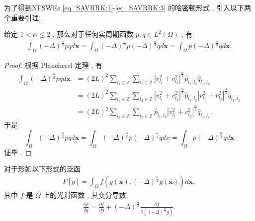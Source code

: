 为了得到NFSWEs \eqref{eq_SAVRRK:1}-\eqref{eq_SAVRRK:3} 的哈密顿形式 , 引入以下两个重要引理 . 
\begin{lemma}\label{lem_PAVF:1}
	\cite{fuStructurepreservingAlgorithmsTwodimensional2020} 
	 给定 $1<\alpha \leq 2$ , 那么对于任何实周期函数 $p , q \in L^{2}(\Omega)$ , 有
	\begin{align}\label{eq_PAVF:22}
	\int_{\Omega}(-\Delta)^{\frac{\alpha}{2}} p q d \boldsymbol{x}=\int_{\Omega}(-\Delta)^{\frac{\alpha}{4}} p(-\Delta)^{\frac{\alpha}{4}} q d \boldsymbol{x}=\int_{\Omega} p(-\Delta)^{\frac{\alpha}{2}} q d \boldsymbol{x} . 
	\end{align}
	\end{lemma}

\begin{proof}
	根据 Plancherel 定理 , 有
\begin{equation}
\begin{aligned}
\int_{\Omega}(-\Delta)^{\frac{\alpha}{2}} p q d \boldsymbol{x} &=(2 L)^{2} \sum_{l_{1} \in \mathbb{Z}} \sum_{l_{2} \in \mathbb{Z}}\left|v_{l_{1}}^{2}+v_{l_{2}}^{2}\right|^{\frac{\alpha}{2}} \hat{p}_{l_{1} , l_{2}} \hat{q}_{l_{1} , l_{2}} \\
&=(2 L)^{2} \sum_{l_{1} \in \mathbb{Z}} \sum_{l_{2} \in \mathbb{Z}}\left|v_{l_{1}}^{2}+v_{l_{2}}^{2}\right|^{\frac{\alpha}{4}} \hat{p}_{l_{1} , l_{2}}\left|v_{l_{1}}^{2}+v_{l_{2}}^{2}\right|^{\frac{\alpha}{4}} \hat{q}_{l_{1} , l_{2}} \\
&=(2 L)^{2} \sum_{l_{1} \in \mathbb{Z}} \sum_{l_{2} \in \mathbb{Z}} \hat{p}_{l_{1} , l_{2}}\left|v_{l_{1}}^{2}+v_{l_{2}}^{2}\right|^{\frac{\alpha}{2}} \hat{q}_{l_{1} , l_{2}}  . 
\end{aligned}
\label{eq_23}\end{equation}
于是
\begin{equation}
\int_{\Omega}(-\Delta)^{\frac{\alpha}{2}} p q d \boldsymbol{x}=\int_{\Omega}(-\Delta)^{\frac{\alpha}{4}} p(-\Delta)^{\frac{\alpha}{4}} q d x=\int_{\Omega} p(-\Delta)^{\frac{\alpha}{2}} q d \boldsymbol{x}
\label{eq_24}\end{equation}
证毕 . 
\end{proof}


\begin{lemma}\label{lem_PAVF:2}
	\cite{wangStructurepreservingNumericalMethods2018} 
	 对于形如以下形式的泛函
	\begin{align}\label{eq_PAVF:25}
	F[g]=\int_{\Omega} f\left(g(\boldsymbol{x}) , (-\Delta)^{\frac{\alpha}{4}} g(\boldsymbol{x})\right) d \boldsymbol{x} , 
	\end{align}
	其中 $f$ 是 $\Omega$ 上的光滑函数 , 其变分导数
	\begin{align}\label{eq_PAVF:26}
	\frac{\delta F}{\delta g}=\frac{\partial f}{\partial g}+(-\Delta)^{\frac{\alpha}{4}} \frac{\partial f}{\partial\left((-\Delta)^{\frac{\alpha}{4}} g\right)}  . 
	\end{align}
	\end{lemma}

